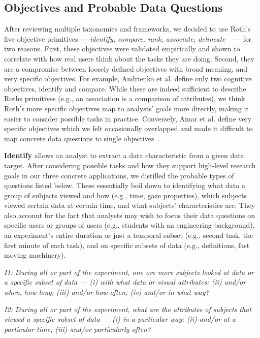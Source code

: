 \subsection{Objectives and Probable Data Questions}
After reviewing multiple taxonomies and frameworks, we decided to use Roth's five objective primitives --- \textit{identify, compare, rank, associate, delineate} ~\cite{Roth13}  --- for two reasons. First, these objectives were validated empirically and shown to correlate with how real users think about the tasks they are doing. Second, they are a compromise between loosely defined objectives with broad meaning, and very specific objectives. For example, Andrienko et al. define only two cognitive objectives, identify and compare. While these are indeed sufficient to describe Roths primitives (e.g., an association is a comparison of attributes), we think Roth's more specific objectives map to analysts' goals more directly, making it easier to consider possible tasks in practice. Conversely, Amar et al. define very specific objectives which we felt occasionally overlapped and made it difficult to map concrete data questions to single objectives~\cite{Ama05}. 

\vspace{2mm}

\noindent\textbf{Identify} allows an analyst to extract a data characteristic from a given data target. After considering possible tasks and how they support high-level research goals in our three concrete applications, we distilled the probable types of questions listed below. These essentially boil down to identifying what data a group of subjects viewed and how (e.g., time, gaze properties), which subjects viewed certain data at certain time, and what subjects' characteristics are. They also account for the fact that analysts may wish to focus their data questions on specific users or groups of users (e.g., students with an engineering background), an experiment's entire duration or just a temporal subset (e.g., second task, the first minute of each task), and on specific subsets of data (e.g., definitions, fast moving machinery). 

\vspace{2mm}
\hangindent=3mm\textit{I1: During all or part of the experiment, one ore more subjects looked at data or a specific subset of data --- (i) with what data or visual attributes; (ii) and/or when, how long; (iii) and/or how often; (iv) and/or in what way?}

\vspace{2mm}
\hangindent=3mm\textit{I2: During all or part of the experiment, what are the attributes of subjects that viewed a specific subset of data --- (i) in a particular way; (ii) and/or at a particular time; (iii) and/or particularly often?} 

